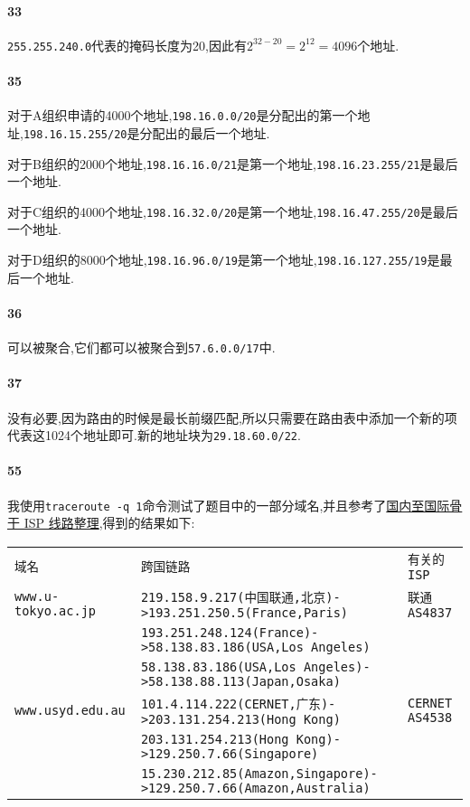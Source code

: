 \documentclass[a4paper]{article}
\begin{document}
\paragraph{33}
\verb|255.255.240.0|代表的掩码长度为20,因此有$2^{32-20}=2^{12}=4096$个地址.
\paragraph{35}
对于A组织申请的4000个地址,\verb|198.16.0.0/20|是分配出的第一个地址,\verb|198.16.15.255/20|是分配出的最后一个地址.

对于B组织的2000个地址,\verb|198.16.16.0/21|是第一个地址,\verb|198.16.23.255/21|是最后一个地址.

对于C组织的4000个地址,\verb|198.16.32.0/20|是第一个地址,\verb|198.16.47.255/20|是最后一个地址.

对于D组织的8000个地址,\verb|198.16.96.0/19|是第一个地址,\verb|198.16.127.255/19|是最后一个地址.
\paragraph{36}
可以被聚合,它们都可以被聚合到\verb|57.6.0.0/17|中.
\paragraph{37}
没有必要,因为路由的时候是最长前缀匹配,所以只需要在路由表中添加一个新的项代表这1024个地址即可.新的地址块为\verb|29.18.60.0/22|.
\paragraph{55}
我使用\verb|traceroute -q 1|命令测试了题目中的一部分域名,并且参考了\href{https://www.gd1214b.icu/post/qfDddx_kZ/}{国内至国际骨干 ISP 线路整理},得到的结果如下:
\begin{table}[H]
    \begin{tabular}{|lll|}
        \hline
        \verb|域名|                & \verb|跨国链路|                                                            & \verb|有关的ISP|        \\
        \verb|www.u-tokyo.ac.jp| & \verb|219.158.9.217(中国联通,北京)->193.251.250.5(France,Paris)|             & \verb|联通AS4837|      \\
                                 & \verb|193.251.248.124(France)->58.138.83.186(USA,Los Angeles)|         &                      \\
                                 & \verb|58.138.83.186(USA,Los Angeles)->58.138.88.113(Japan,Osaka)|      &                      \\
        \verb|www.usyd.edu.au|   & \verb|101.4.114.222(CERNET,广东)->203.131.254.213(Hong Kong)|            & \verb|CERNET AS4538| \\
                                 & \verb|203.131.254.213(Hong Kong)->129.250.7.66(Singapore)|             &                      \\
                                 & \verb|15.230.212.85(Amazon,Singapore)->129.250.7.66(Amazon,Australia)| &                      \\
        \hline
    \end{tabular}
\end{table}
\end{document}
